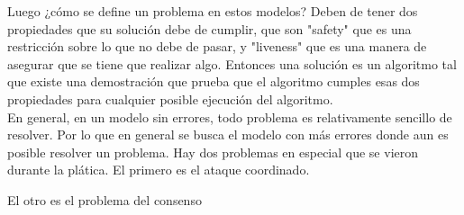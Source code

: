 \documentclass[12pt,a4paper]{report}
\begin{document}
\begin{enumerate}
{		Luego ¿cómo se define un problema en estos modelos?
		Deben de tener dos propiedades que su solución debe de cumplir, que son
		"safety" que es una restricción sobre lo que no debe de pasar, y "liveness" que es
		una manera de asegurar que se tiene que realizar algo.
		Entonces una solución es un algoritmo tal que existe una demostración que
		prueba que el algoritmo cumples esas dos propiedades para cualquier posible
		ejecución del algoritmo.\\
		En general, en un modelo sin errores, todo problema es relativamente sencillo
		de resolver. Por lo que en general se busca el modelo con más errores donde
		aun es posible resolver un problema.
		Hay dos problemas en especial que se vieron durante la plática.
		El primero es el ataque coordinado.

		El otro es el problema del consenso

	}

\end{enumerate}
\end{document}
